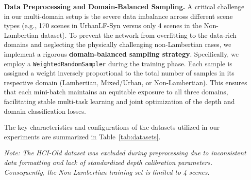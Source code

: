 \documentclass[lettersize,journal]{IEEEtran}
\begin{document}
\textbf{Data Preprocessing and Domain-Balanced Sampling.} 
A critical challenge in our multi-domain setup is the severe data imbalance across different scene types (e.g., 170 scenes in UrbanLF-Syn versus only 4 scenes in the Non-Lambertian dataset). To prevent the network from overfitting to the data-rich domains and neglecting the physically challenging non-Lambertian cases, we implement a rigorous \textbf{domain-balanced sampling strategy}. Specifically, we employ a \texttt{WeightedRandomSampler} during the training phase. Each sample is assigned a weight inversely proportional to the total number of samples in its respective domain (Lambertian, Mixed/Urban, or Non-Lambertian). This ensures that each mini-batch maintains an equitable exposure to all three domains, facilitating stable multi-task learning and joint optimization of the depth and domain classification losses.

The key characteristics and configurations of the datasets utilized in our experiments are summarized in Table~\ref{tab:datasets}.

\begin{table}[!t]
\caption{Summary of Datasets Used for Training and Evaluation}
\label{tab:datasets}
\centering\small
{}
\vspace{4pt}
\parbox{\textwidth}{\footnotesize \textit{Note: The HCI-Old dataset was excluded during preprocessing due to inconsistent data formatting and lack of standardized depth calibration parameters. Consequently, the Non-Lambertian training set is limited to 4 scenes.}}
\end{table}
\end{document}
